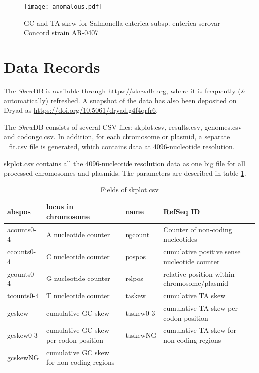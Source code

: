 \documentclass[fleqn,10pt]{wlscirep}
\begin{document}
\begin{figure}[ht]
\centering
\texttt{[image: anomalous.pdf]}
\caption{GC and TA skew for Salmonella enterica subsp. enterica serovar Concord strain AR-0407}
\label{fig:anomalous}
\end{figure}

\section*{Data Records}
The \emph{Skew}DB is available through \url{https://skewdb.org}, where it is frequently (\& automatically) refreshed. A snapshot of the data has also been deposited on Dryad as \url{https://doi.org/10.5061/dryad.g4f4qrfr6}.

The \emph{Skew}DB consists of several CSV files: skplot.csv, results.csv, genomes.csv and codongc.csv.
In addition, for each chromosome or plasmid, a separate \_fit.csv file is generated, which contains data at 4096-nucleotide resolution.

skplot.csv contains all the 4096-nucleotide resolution data as one big file for all processed chromosomes and plasmids. The parameters are described in table \ref{tab:skplot}.
\begin{table}[ht]
\begin{tabular}{|l|l|l|l|}
\hline
abspos     & locus in chromosome                       & name      & RefSeq ID                                   \\ \hline
acounts0-4 & A nucleotide counter                      & ngcount   & Counter of non-coding nucleotides           \\ \hline
ccounts0-4 & C nucleotide counter                      & pospos    & cumulative positive sense nucleotide counter \\ \hline
gcounts0-4 & G nucleotide counter                      & relpos    & relative position within chromosome/plasmid \\ \hline
tcounts0-4 & T nucleotide counter                      & taskew    & cumulative TA skew                          \\ \hline
gcskew     & cumulative GC skew                        & taskew0-3 & cumulative TA skew per codon position       \\ \hline
gcskew0-3  & cumulative GC skew per codon position     & taskewNG  & cumulative TA skew for non-coding regions   \\ \hline
gcskewNG   & cumulative GC skew for non-coding regions &           &                                             \\ \hline
\end{tabular}
\caption{Fields of skplot.csv}
\label{tab:skplot}
\end{table}
\end{document}
